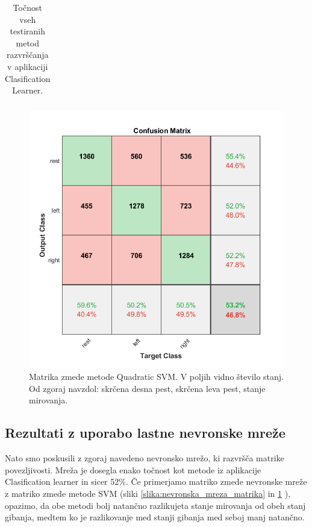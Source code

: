 \begin{table}
\begin{tabular}{|l|l|c|}
\hline
\end{tabular}
\caption{Točnost vseh testiranih metod razvrščanja v aplikaciji Clasification Learner.}
\label{tabela:primerjava_tocnosti}
\end{table}

\begin{figure}
    \begin{center}
    \includegraphics[width=0.8\linewidth]{slike/ConfusionSVM.png}
    \end{center}
    \caption{Matrika zmede metode Quadratic SVM. V poljih vidno število stanj. Od zgoraj navzdol: skrčena desna pest, skrčena leva pest, stanje mirovanja.}
    \label{slika:SVM_matrika}
    \end{figure}

\subsection{Rezultati z uporabo lastne nevronske mreže}
Nato smo poskusili z zgoraj navedeno nevronsko mrežo, ki razvršča matrike povezljivosti. Mreža je dosegla enako točnost kot metode iz aplikacije Clasification learner in sicer 52\%. Če primerjamo matriko zmede nevronske mreže z matriko zmede metode SVM (sliki \ref{slika:nevronska_mreza_matrika} in \ref{slika:SVM_matrika} ), opazimo, da obe metodi bolj natančno razlikujeta stanje mirovanja od obeh stanj gibanja, medtem ko je razlikovanje med stanji gibanja med seboj manj natančno.

